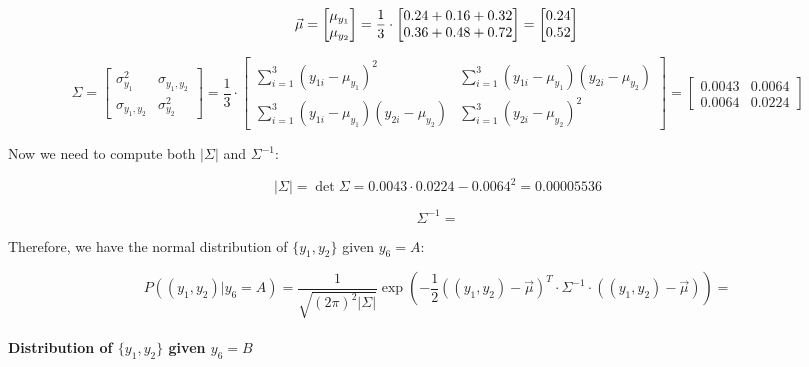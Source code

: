 \documentclass{article}
\begin{document}
\[
  \vec{\mu} =  \left[\begin{matrix} \mu_{y_1} \\ \mu_{y_2} \end{matrix} \right]= \frac{1}{3} \cdot 
  \left[\begin{matrix}
    0.24 + 0.16 + 0.32 \\
    0.36 + 0.48 + 0.72
  \end{matrix}\right] = \left[\begin{matrix}
    0.24 \\
    0.52
  \end{matrix}\right] \\
\]

\[
  \Sigma = \left[ \begin{matrix}
    \sigma_{y_1}^2 & \sigma_{y_1,y_2} \\
    \sigma_{y_1,y_2} & \sigma_{y_2}^2
  \end{matrix} \right] = \frac{1}{3} \cdot \begin{bmatrix}
    \sum_{i=1}^{3} (y_{1i} - \mu_{y_1})^2 & \sum_{i=1}^{3} (y_{1i} - \mu_{y_1})(y_{2i} - \mu_{y_2}) \\
    \sum_{i=1}^{3} (y_{1i} - \mu_{y_1})(y_{2i} - \mu_{y_2}) & \sum_{i=1}^{3} (y_{2i} - \mu_{y_2})^2
  \end{bmatrix}  = \begin{bmatrix}
    0.0043 & 0.0064 \\
    0.0064 & 0.0224
  \end{bmatrix}
\]

Now we need to compute both $|\Sigma|$ and $\Sigma^{-1}$:

\[
  |\Sigma| = \det \Sigma = 0.0043 \cdot 0.0224 - 0.0064^2 = 0.00005536
\]

\[
  \Sigma^{-1} = 
\]

Therefore, we have the normal distribution of $\{y_1,y_2\}$ given $y_6=A$:

\[
    P((y_1,y_2)|y_6=A) = \frac{1}{\sqrt{(2\pi)^2 |\Sigma|}} \exp \left( -\frac{1}{2} ((y_1,y_2) - \vec{\mu})^T \cdot \Sigma^{-1} \cdot ((y_1,y_2) - \vec{\mu}) \right)=
\]




\paragraph{Distribution of $\{y_1,y_2\}$ given $y_6=B$}
\paragraph{}
\end{document}
